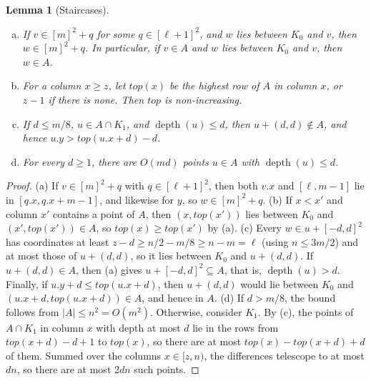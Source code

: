 \documentclass[11pt]{article}
\newtheorem{lemma}[theorem]{Lemma}
\theoremstyle{definition}
\renewcommand{\O}{O}
\DeclareMathOperator{\depth}{depth}
\newcommand{\abs}[1]{\lvert #1 \rvert}
\newcommand{\x}[1]{#1.x}
\newcommand{\y}[1]{#1.y}
\begin{document}
\begin{lemma}[Staircases]\label{lem:monotone}
\begin{enumerate}[(a)]
\item If $v \in [m]^2 + q$ for some $q \in [\ell+1]^2$, and $w$ lies between $K_0$ and $v$, then $w \in [m]^2 + q$.
In particular, if $v \in A$ and $w$ lies between $K_0$ and $v$, then $w \in A$.
\item For a column $x \ge z$, let $\mathit{top}(x)$ be the highest row of $A$ in column $x$, or $z - 1$ if there is none. Then $\mathit{top}$ is non-increasing.
\item If $d \le m/8$, $u \in A \cap K_1$, and $\depth(u) \le d$, then $u + (d,d) \notin A$, and hence $\y u > \mathit{top}(\x u + d) - d$.
\item For every $d \ge 1$, there are $\O(md)$ points $u \in A$ with $\depth(u) \le d$.
\end{enumerate}
\end{lemma}
\begin{proof}
(a) If $v \in [m]^2 + q$ with $q \in [\ell+1]^2$, then both $\x v$ and $[\ell, m-1]$ lie in $[\x q, \x q + m - 1]$, and likewise for $y$, so $w \in [m]^2 + q$.
(b) If $x < x'$ and column $x'$ contains a point of $A$, then $(x, \mathit{top}(x'))$ lies between $K_0$ and $(x', \mathit{top}(x')) \in A$, so $\mathit{top}(x) \ge \mathit{top}(x')$ by (a).
(c) Every $w \in u + [-d,d]^2$ has coordinates at least $z - d \ge n/2 - m/8 \ge n - m = \ell$ (using $n \le 3m/2$) and at most those of $u + (d,d)$, so it lies between $K_0$ and $u + (d,d)$.
If $u + (d,d) \in A$, then (a) gives $u + [-d,d]^2 \subseteq A$, that is, $\depth(u) > d$.
Finally, if $\y u + d \le \mathit{top}(\x u + d)$, then $u + (d,d)$ would lie between $K_0$ and $(\x u + d, \mathit{top}(\x u + d)) \in A$, and hence in $A$.
(d) If $d > m/8$, the bound follows from $\abs{A} \le n^2 = \O(m^2)$.
Otherwise, consider $K_1$.
By (c), the points of $A \cap K_1$ in column $x$ with depth at most $d$ lie in the rows from $\mathit{top}(x + d) - d + 1$ to $\mathit{top}(x)$, so there are at most $\mathit{top}(x) - \mathit{top}(x+d) + d$ of them.
Summed over the columns $x \in [z, n)$, the differences telescope to at most $dn$, so there are at most $2dn$ such points.
\end{proof}
\end{document}
